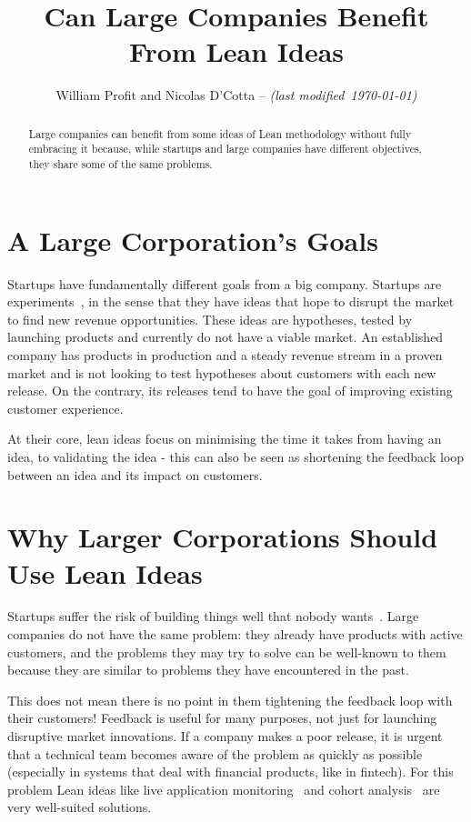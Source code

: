 \documentclass[conference]{IEEEtran}
\title{Can Large Companies Benefit From Lean Ideas}
\begin{document}
    \author{William Profit and Nicolas D'Cotta --
     \emph{(last modified~\today)}}

    \maketitle

    \begin{abstract}
        Large companies can benefit from some ideas of Lean methodology without fully embracing it because, while startups and large companies have different objectives, they share some of the same problems.
    \end{abstract}


    \section{A Large Corporation's Goals}
    \label{section:intro}
    Startups have fundamentally different goals from a big company.
    Startups are experiments~\cite{theLeanStartup}, in the sense that they have ideas that hope to disrupt the market to find new revenue opportunities.
    These ideas are hypotheses, tested by launching products and currently do not have a viable market.
    An established company has products in production and a steady
    revenue stream in a proven market and is not looking to test hypotheses about customers with each new release.
    On the contrary, its releases tend to have the goal of improving existing customer experience.

    At their core, lean ideas focus on minimising the time it takes from having an idea, to validating the idea - this can also be seen as shortening the feedback loop between an idea and its impact on customers.

    \section{Why Larger Corporations Should Use Lean Ideas}
    Startups suffer the risk of building things well that nobody wants~\cite{theLeanStartup}.
    Large companies do not have the same problem: they already have products with active customers, and
    the problems they may try to solve can be well-known to them because they are similar to problems
    they have encountered in the past.

    This does not mean there is no point in them tightening the feedback
    loop with their customers! Feedback is useful for many purposes, not just for launching disruptive market innovations.
    If a company makes a poor release, it is urgent that a technical team becomes aware of the problem as quickly as possible
    (especially in systems that deal with financial products, like in fintech).
    For this problem Lean ideas like live application monitoring~\cite{dragichApm} and cohort analysis~\cite{theLeanStartupBlog} are very well-suited solutions.
\end{document}

